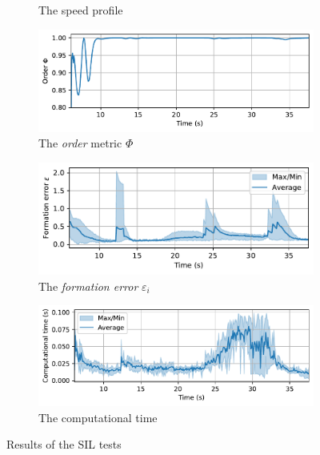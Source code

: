 \begin{figure}
\begin{subfigure}[b]{0.495\textwidth}
    \caption{The speed profile}
    \label{fig:gazebo_speed}
    \end{subfigure}
    \begin{subfigure}[b]{0.495\textwidth}
    \includegraphics[width=\textwidth]{paper3/images/gazebo_order.pdf}
    \caption{The \textit{order} metric $\Phi$}
    \label{fig:gazebo_order}
    \end{subfigure}
    \begin{subfigure}[b]{0.495\textwidth}
    \includegraphics[width=\textwidth]{paper3/images/gazebo_error.pdf}
    \caption{The \textit{formation error} $\varepsilon_i$}
    \label{fig:gazebo_error}
    \end{subfigure}
    \begin{subfigure}[b]{0.495\textwidth}
    \includegraphics[width=\textwidth]{paper3/images/gazebo_computation.pdf}
    \caption{The computational time}
    \label{fig:gazebo_time}
    \end{subfigure}
    \caption{Results of the SIL tests}
    \label{fig:gazebo}
\end{figure}

